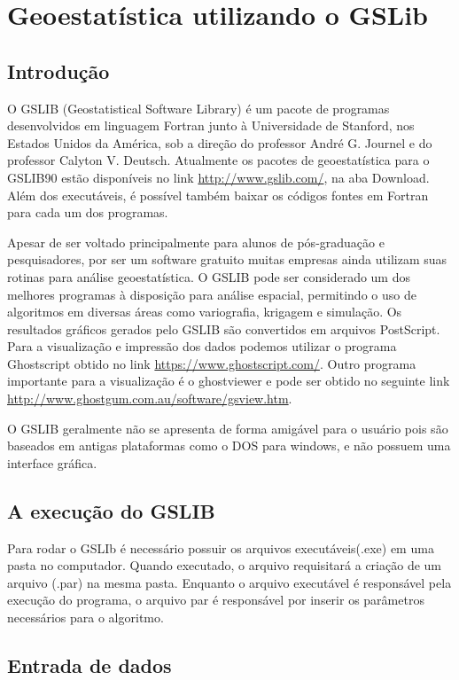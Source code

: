 \chapter{Geoestatística utilizando o GSLib} 

\section{Introdução}

O GSLIB (Geostatistical Software Library) é um pacote de programas desenvolvidos em linguagem Fortran junto à Universidade de Stanford, nos Estados Unidos da América, sob a direção do professor André G. Journel e do professor Calyton V. Deutsch. Atualmente os pacotes de geoestatística para o GSLIB90 estão disponíveis no link \url{http://www.gslib.com/}, na aba Download. Além dos executáveis, é possível também baixar os códigos fontes em Fortran para cada um dos programas. 

Apesar de ser voltado principalmente para alunos de pós-graduação e pesquisadores, por ser um software gratuito muitas empresas ainda utilizam suas rotinas para análise geoestatística. O GSLIB pode ser considerado um dos melhores programas à disposição para análise espacial, permitindo o uso de algoritmos em diversas áreas como variografia, krigagem e simulação. Os resultados gráficos gerados pelo GSLIB são convertidos em arquivos PostScript. Para  a visualização e impressão dos dados podemos utilizar o programa Ghostscript obtido no link  \url{https://www.ghostscript.com/}. Outro programa importante para a visualização é o ghostviewer e pode ser obtido no seguinte link \url{http://www.ghostgum.com.au/software/gsview.htm}.

O GSLIB geralmente não se apresenta de forma amigável para o usuário pois são baseados em antigas plataformas como o DOS para windows, e não possuem uma interface gráfica. 

\section{A execução do GSLIB} 

Para rodar o GSLIb é necessário possuir os arquivos executáveis(.exe) em uma pasta no computador. Quando executado, o arquivo requisitará a criação de um arquivo (.par) na mesma pasta. Enquanto o arquivo executável é responsável pela execução do programa, o arquivo par é responsável por inserir os parâmetros necessários para o algoritmo. 

\section{Entrada de dados} \label{Arquivos_GSLIB}

